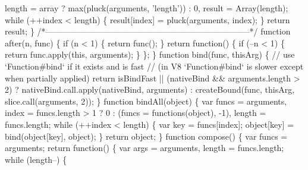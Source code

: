 \begin{DoxyCodeInclude}
{{\textcolor{stringliteral}{        length = array ? max(pluck(arguments, 'length')) : 0,}
\textcolor{stringliteral}{        result = Array(length);}
\textcolor{stringliteral}{}
\textcolor{stringliteral}{    while (++index < length) \{}
\textcolor{stringliteral}{      result[index] = pluck(arguments, index);}
\textcolor{stringliteral}{    \}}
\textcolor{stringliteral}{    return result;}
\textcolor{stringliteral}{  \}}
\textcolor{stringliteral}{}
\textcolor{stringliteral}{  /*--------------------------------------------------------------------------*/}
\textcolor{stringliteral}{}
\textcolor{stringliteral}{  function after(n, func) \{}
\textcolor{stringliteral}{    if (n < 1) \{}
\textcolor{stringliteral}{      return func();}
\textcolor{stringliteral}{    \}}
\textcolor{stringliteral}{    return function() \{}
\textcolor{stringliteral}{      if (--n < 1) \{}
\textcolor{stringliteral}{        return func.apply(this, arguments);}
\textcolor{stringliteral}{      \}}
\textcolor{stringliteral}{    \};}
\textcolor{stringliteral}{  \}}
\textcolor{stringliteral}{}
\textcolor{stringliteral}{  function bind(func, thisArg) \{}
\textcolor{stringliteral}{    // use `Function#bind` if it exists and is fast}
\textcolor{stringliteral}{    // (in V8 `Function#bind` is slower except when partially applied)}
\textcolor{stringliteral}{    return isBindFast || (nativeBind && arguments.length > 2)}
\textcolor{stringliteral}{      ? nativeBind.call.apply(nativeBind, arguments)}
\textcolor{stringliteral}{      : createBound(func, thisArg, slice.call(arguments, 2));}
\textcolor{stringliteral}{  \}}
\textcolor{stringliteral}{}
\textcolor{stringliteral}{  function bindAll(object) \{}
\textcolor{stringliteral}{    var funcs = arguments,}
\textcolor{stringliteral}{        index = funcs.length > 1 ? 0 : (funcs = functions(object), -1),}
\textcolor{stringliteral}{        length = funcs.length;}
\textcolor{stringliteral}{}
\textcolor{stringliteral}{    while (++index < length) \{}
\textcolor{stringliteral}{      var key = funcs[index];}
\textcolor{stringliteral}{      object[key] = bind(object[key], object);}
\textcolor{stringliteral}{    \}}
\textcolor{stringliteral}{    return object;}
\textcolor{stringliteral}{  \}}
\textcolor{stringliteral}{}
\textcolor{stringliteral}{  function compose() \{}
\textcolor{stringliteral}{    var funcs = arguments;}
\textcolor{stringliteral}{    return function() \{}
\textcolor{stringliteral}{      var args = arguments,}
\textcolor{stringliteral}{          length = funcs.length;}
\textcolor{stringliteral}{}
\textcolor{stringliteral}{      while (length--) \{}
}}
\end{DoxyCodeInclude}
